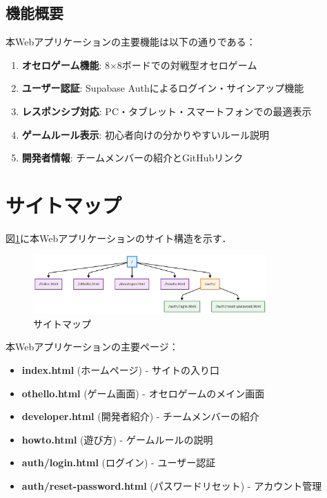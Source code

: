 \documentclass[10pt, a4paper]{jsarticle}
\begin{document}
\subsection{機能概要}
本Webアプリケーションの主要機能は以下の通りである：

\begin{enumerate}
    \item \textbf{オセロゲーム機能}: 8×8ボードでの対戦型オセロゲーム
    \item \textbf{ユーザー認証}: Supabase Authによるログイン・サインアップ機能
    \item \textbf{レスポンシブ対応}: PC・タブレット・スマートフォンでの最適表示
    \item \textbf{ゲームルール表示}: 初心者向けの分かりやすいルール説明
    \item \textbf{開発者情報}: チームメンバーの紹介とGitHubリンク
\end{enumerate}

\section{サイトマップ}\label{sec:sitemap}

図\ref{fig:sitemap}に本Webアプリケーションのサイト構造を示す．

\begin{figure}[H]
\centering
\includegraphics[width=0.8\textwidth]{img/sitemap.png}
\caption{サイトマップ}
\label{fig:sitemap}
\end{figure}

本Webアプリケーションの主要ページ：
\begin{itemize}
    \item \textbf{index.html} (ホームページ) - サイトの入り口
    \item \textbf{othello.html} (ゲーム画面) - オセロゲームのメイン画面
    \item \textbf{developer.html} (開発者紹介) - チームメンバーの紹介
    \item \textbf{howto.html} (遊び方) - ゲームルールの説明
    \item \textbf{auth/login.html} (ログイン) - ユーザー認証
    \item \textbf{auth/reset-password.html} (パスワードリセット) - アカウント管理
\end{itemize}
\end{document}
